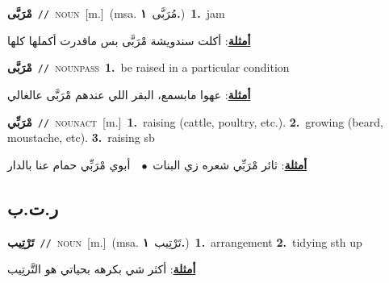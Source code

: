 \documentclass[10pt,a4paper,twoside]{article} %
\begin{document}
\begin{multicols}{2}
{\setlength\topsep{0pt}\textbf{\foreignlanguage{arabic}{مْرَبَّى}}\ {\color{gray}\texttt{//}\color{black}}\ \textsc{noun}\ [m.]\ \color{gray}(msa. \foreignlanguage{arabic}{مُرَبَّى}~\foreignlanguage{arabic}{\textbf{١.}})\color{black}\ \textbf{1.}~jam\  \begin{flushright}\color{gray}\foreignlanguage{arabic}{\textbf{\underline{\foreignlanguage{arabic}{أمثلة}}}: أكلت سندويشة مْرَبَّى بس ماقدرت أكملها كلها}\end{flushright}\color{black}} \vspace{2mm}

{\setlength\topsep{0pt}\textbf{\foreignlanguage{arabic}{مْرَبَّى}}\ {\color{gray}\texttt{//}\color{black}}\ \textsc{noun\textunderscore pass}\ \textbf{1.}~be raised in a particular condition\  \begin{flushright}\color{gray}\foreignlanguage{arabic}{\textbf{\underline{\foreignlanguage{arabic}{أمثلة}}}: عهوا مابسمع، البقر اللي عندهم مْرَبَّى عالغالي}\end{flushright}\color{black}} \vspace{2mm}

{\setlength\topsep{0pt}\textbf{\foreignlanguage{arabic}{مْرَبِّي}}\ {\color{gray}\texttt{//}\color{black}}\ \textsc{noun\textunderscore act}\ [m.]\ \textbf{1.}~raising (cattle, poultry, etc.).  \textbf{2.}~growing (beard, moustache, etc).  \textbf{3.}~raising sb\  \begin{flushright}\color{gray}\foreignlanguage{arabic}{\textbf{\underline{\foreignlanguage{arabic}{أمثلة}}}: ثائر مْرَبِّي شعره زي البنات\ $\bullet$\ \  أبوي مْرَبِّي حمام عنا بالدار}\end{flushright}\color{black}} \vspace{2mm}

\vspace{-3mm}
\subsection*{\color{blue}\foreignlanguage{arabic}{ر.ت.ب}\color{blue}{}} 

{\setlength\topsep{0pt}\textbf{\foreignlanguage{arabic}{تَرْتِيب}}\ {\color{gray}\texttt{//}\color{black}}\ \textsc{noun}\ [m.]\ \color{gray}(msa. \foreignlanguage{arabic}{تَرْتِيب}~\foreignlanguage{arabic}{\textbf{١.}})\color{black}\ \textbf{1.}~arrangement  \textbf{2.}~tidying sth up\  \begin{flushright}\color{gray}\foreignlanguage{arabic}{\textbf{\underline{\foreignlanguage{arabic}{أمثلة}}}: أكثر شي بكرهه بحياتي هو التَّرتِيب}\end{flushright}\color{black}} \vspace{2mm}


\end{multicols}
\end{document}
